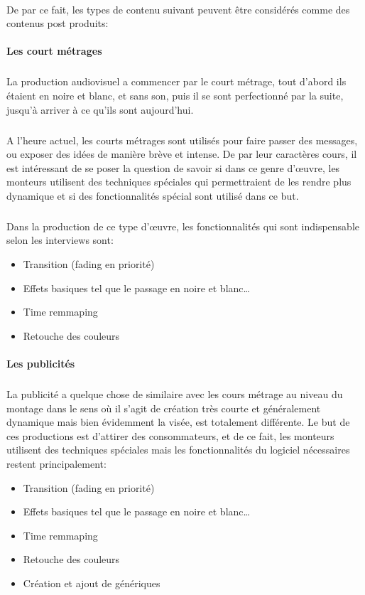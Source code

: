 \paragraph{}
De par ce fait, les types de contenu suivant peuvent être considérés comme des contenus post produits:

\paragraph{Les court métrages}
\subparagraph{}
La production audiovisuel a commencer par le court métrage, tout d'abord ils
étaient en noire et blanc, et sans son, puis il se sont perfectionné par la suite,
jusqu'à arriver à ce qu'ils sont aujourd'hui.

\subparagraph{}
A l'heure actuel, les courts métrages sont utilisés pour faire passer des messages,
ou exposer des idées de manière brève et intense. De par leur caractères
cours, il est intéressant de se poser la question de savoir si dans ce genre
d'œuvre, les monteurs utilisent des techniques spéciales qui permettraient
de les rendre plus dynamique et si des fonctionnalités spécial sont utilisé dans
ce but.
\subparagraph{}
Dans la production de ce type d'œuvre, les fonctionnalités qui sont indispensable
selon les interviews sont:
\begin{itemize}
  \item{Transition (fading en priorité)}
  \item{Effets basiques tel que le passage en noire et blanc\ldots}
  \item{Time remmaping}
  \item{Retouche des couleurs}
\end{itemize}

\paragraph {Les publicités}
\subparagraph{}
La publicité a quelque chose de similaire avec les cours métrage au niveau du
montage dans le sens où il s'agit de création très courte et généralement dynamique
mais bien évidemment la visée, est totalement différente. Le but de ces productions
est d'attirer des consommateurs, et de ce fait, les monteurs utilisent des
techniques spéciales mais les fonctionnalités du logiciel nécessaires restent
principalement:
\begin{itemize}
  \item{Transition (fading en priorité)}
  \item{Effets basiques tel que le passage en noire et blanc\ldots}
  \item{Time remmaping}
  \item{Retouche des couleurs}
  \item{Création et ajout de génériques}
\end{itemize}
\subparagraph{}

